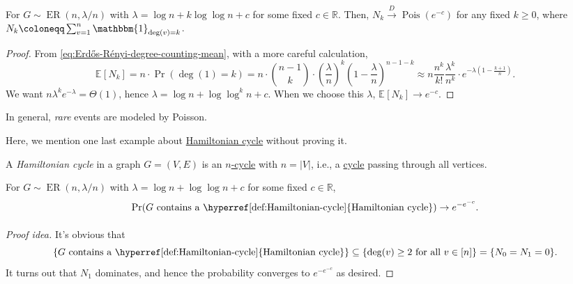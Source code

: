 \begin{theorem}
	For \(G \sim \operatorname{ER}(n, \lambda / n) \) with \(\lambda = \log n + k \log \log n + c\) for some fixed \(c \in \mathbb{R} \). Then, \(N_k \overset{D}{\to} \operatorname{Pois}(e^{-c}) \) for any fixed \(k \geq 0\), where \(N_k \coloneqq \sum_{v=1}^{n} \mathbbm{1}_{\deg (v) = k} \).
\end{theorem}
\begin{proof}
	From \autoref{eq:Erdős-Rényi-degree-counting-mean}, with a more careful calculation,
	\[
		\mathbb{E}_{}[N_k]
		= n \cdot \Pr_{}(\deg (1) = k)
		= n \cdot \binom{n-1}{k} \cdot \left( \frac{\lambda}{n} \right) ^k \left( 1 - \frac{\lambda}{n} \right) ^{n-1-k}
		\approx n \frac{n^k}{k!} \frac{\lambda ^k}{n^k} \cdot e^{-\lambda (1 - \frac{k+1}{n})}.
	\]
	We want \(n \lambda ^k e^{-\lambda } = \Theta (1)\), hence \(\lambda = \log n + \log \log^k n + c\). When we choose this \(\lambda \), \(\mathbb{E}_{}[N_k] \to e^{-c}\).
\end{proof}

\begin{remark}
	In general, \emph{rare} events are modeled by Poisson.
\end{remark}

Here, we mention one last example about \hyperref[def:Hamiltonian-cycle]{Hamiltonian cycle} without proving it.

\begin{definition}\label{def:Hamiltonian-cycle}
	A \emph{Hamiltonian cycle} in a graph \(G = (V, E)\) is an \hyperref[def:cycle]{\(n\)-cycle} with \(n = \lvert V \rvert \), i.e., a \hyperref[def:cycle]{cycle} passing through all vertices.
\end{definition}

\begin{theorem}
	For \(G \sim \operatorname{ER}(n, \lambda / n) \) with \(\lambda = \log n + \log \log n + c\) for some fixed \(c \in \mathbb{R} \),
	\[
		\Pr_{}(G\text{ contains a \hyperref[def:Hamiltonian-cycle]{Hamiltonian cycle}} )
		\to e^{-e^{-c}}.
	\]
\end{theorem}
\begin{proof}[Proof idea]
	It's obvious that
	\[
		\{G \text{ contains a \hyperref[def:Hamiltonian-cycle]{Hamiltonian cycle}} \}
		\subseteq \{ \deg (v) \geq 2 \text{ for all } v \in [n] \}
		= \{ N_0 = N_1 = 0\}.
	\]
	It turns out that \(N_1\) dominates, and hence the probability converges to \(e^{-e^{-c}}\) as desired.
\end{proof}

